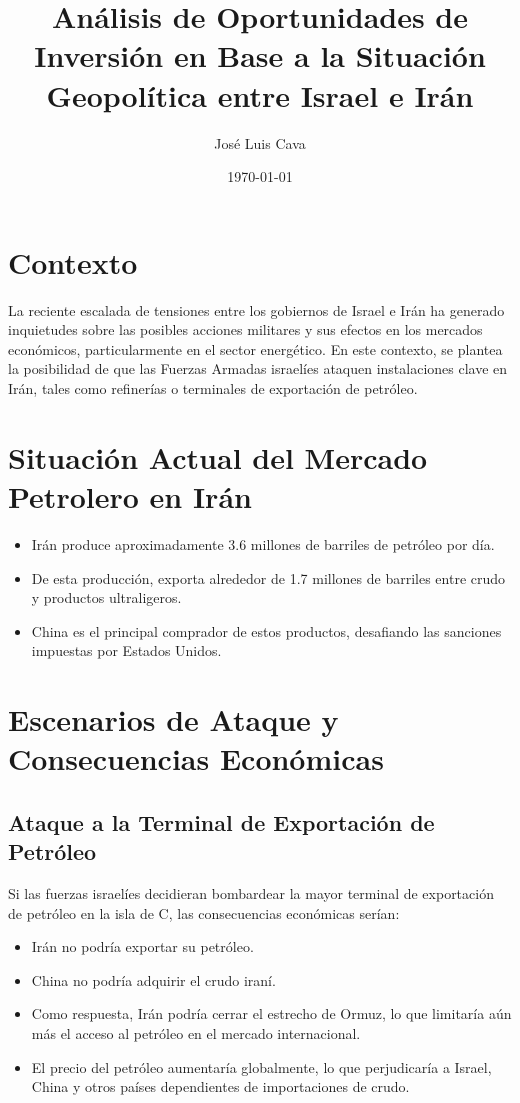 \documentclass{article}
\title{Análisis de Oportunidades de Inversión en Base a la Situación Geopolítica entre Israel e Irán}
\author{José Luis Cava}
\date{\today}
\begin{document}
\maketitle

\section{Contexto}
La reciente escalada de tensiones entre los gobiernos de Israel e Irán ha generado inquietudes sobre las posibles acciones militares y sus efectos en los mercados económicos, particularmente en el sector energético. En este contexto, se plantea la posibilidad de que las Fuerzas Armadas israelíes ataquen instalaciones clave en Irán, tales como refinerías o terminales de exportación de petróleo.

\section{Situación Actual del Mercado Petrolero en Irán}
\begin{itemize}
    \item Irán produce aproximadamente 3.6 millones de barriles de petróleo por día.
    \item De esta producción, exporta alrededor de 1.7 millones de barriles entre crudo y productos ultraligeros.
    \item China es el principal comprador de estos productos, desafiando las sanciones impuestas por Estados Unidos.
\end{itemize}

\section{Escenarios de Ataque y Consecuencias Económicas}

\subsection{Ataque a la Terminal de Exportación de Petróleo}
Si las fuerzas israelíes decidieran bombardear la mayor terminal de exportación de petróleo en la isla de C, las consecuencias económicas serían:
\begin{itemize}
    \item Irán no podría exportar su petróleo.
    \item China no podría adquirir el crudo iraní.
    \item Como respuesta, Irán podría cerrar el estrecho de Ormuz, lo que limitaría aún más el acceso al petróleo en el mercado internacional.
    \item El precio del petróleo aumentaría globalmente, lo que perjudicaría a Israel, China y otros países dependientes de importaciones de crudo.
\end{itemize}
\end{document}
